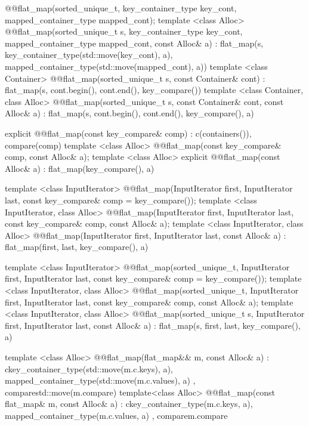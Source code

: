 \begin{codeblock}
{{    @@flat_map(sorted_unique_t,
                       key_container_type key_cont, mapped_container_type mapped_cont);
    template <class Alloc>
    @@flat_map(sorted_unique_t s, key_container_type key_cont,
                       mapped_container_type mapped_cont, const Alloc& a)
        : flat_map(s, key_container_type(std::move(key_cont), a),
                   mapped_container_type(std::move(mapped_cont), a))
      { }
    template <class Container>
      @@flat_map(sorted_unique_t s, const Container& cont)
        : flat_map(s, cont.begin(), cont.end(), key_compare()) { }
    template <class Container, class Alloc>
      @@flat_map(sorted_unique_t s, const Container& cont, const Alloc& a)
        : flat_map(s, cont.begin(), cont.end(), key_compare(), a) { }

    explicit @@flat_map(const key_compare& comp)
      : c(containers()), compare(comp) { }
    template <class Alloc>
      @@flat_map(const key_compare& comp, const Alloc& a);
    template <class Alloc>
      explicit @@flat_map(const Alloc& a)
        : flat_map(key_compare(), a) { }

    template <class InputIterator>
      @@flat_map(InputIterator first, InputIterator last,
                         const key_compare& comp = key_compare());
    template <class InputIterator, class Alloc>
      @@flat_map(InputIterator first, InputIterator last,
                         const key_compare& comp, const Alloc& a);
    template <class InputIterator, class Alloc>
      @@flat_map(InputIterator first, InputIterator last,
                         const Alloc& a)
        : flat_map(first, last, key_compare(), a) { }

    template <class InputIterator>
      @@flat_map(sorted_unique_t, InputIterator first, InputIterator last,
                         const key_compare& comp = key_compare());
    template <class InputIterator, class Alloc>
      @@flat_map(sorted_unique_t, InputIterator first, InputIterator last,
                         const key_compare& comp, const Alloc& a);
    template <class InputIterator, class Alloc>
      @@flat_map(sorted_unique_t s, InputIterator first, InputIterator last,
                         const Alloc& a)
        : flat_map(s, first, last, key_compare(), a) { }

    template <class Alloc>
      @@flat_map(flat_map&& m, const Alloc& a)
        : c{key_container_type(std::move(m.c.keys), a),
            mapped_container_type(std::move(m.c.values), a)}
        , compare{std::move(m.compare)}
      { }
    template<class Alloc>
      @@flat_map(const flat_map& m, const Alloc& a)
        : c{key_container_type(m.c.keys, a),
            mapped_container_type(m.c.values, a)}
        , compare{m.compare}
      { }

}}
\end{codeblock}
